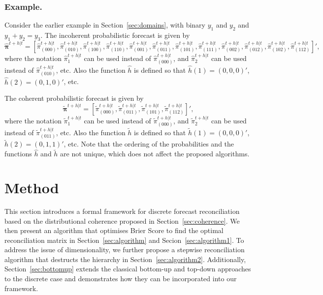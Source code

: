 \documentclass[a4paper,review,12pt,authoryear]{elsarticle}
\newcommand{\bpi}{\bm{\pi}}
\begin{document}
  \subsubsection*{\textbf{Example}.}
  
  Consider the earlier example in Section~\ref{sec:domains}, with binary $y_1$ and $y_2$ and $y_1+y_2=y_3$. The incoherent probabilistic forecast is given by
  \[
    \hat{\bpi}^{t+h|t}= \left[       
      \hat{\pi}^{t+h|t}_{(000)},
       \hat{\pi}^{t+h|t}_{(010)},
       \hat{\pi}^{t+h|t}_{(100)},
       \hat{\pi}^{t+h|t}_{(110)},
       \hat{\pi}^{t+h|t}_{(001)},
       \hat{\pi}^{t+h|t}_{(011)},
       \hat{\pi}^{t+h|t}_{(101)},
       \hat{\pi}^{t+h|t}_{(111)},
       \hat{\pi}^{t+h|t}_{(002)},
       \hat{\pi}^{t+h|t}_{(012)},
       \hat{\pi}^{t+h|t}_{(102)},
       \hat{\pi}^{t+h|t}_{(112)}
       \right]',
  \]
  where the notation $\hat{\pi}^{t+h|t}_{1}$ can be used instead of $\hat{\pi}^{t+h|t}_{(000)}$, and $\hat{\pi}^{t+h|t}_{2}$ can be used instead of $\hat{\pi}^{t+h|t}_{(010)}$, etc. Also the function $\hat{h}$ is defined so that $\hat{h}(1)=(0,0,0)'$, $\hat{h}(2)=(0,1,0)'$, etc.
  
  The coherent probabilistic forecast is given by
  \[
  \tilde{\bpi}^{t+h|t}=\left[
  \tilde{\pi}^{t+h|t}_{(000)},
  \tilde{\pi}^{t+h|t}_{(011)},
  \tilde{\pi}^{t+h|t}_{(101)},
  \tilde{\pi}^{t+h|t}_{(112)}
  \right]',\]
  where the notation $\tilde{\pi}^{t+h|t}_{1}$ can be used instead of $\tilde{\pi}^{t+h|t}_{(000)}$, and $\tilde{\pi}^{t+h|t}_{2}$ can be used instead of $\tilde{\pi}^{t+h|t}_{(011)}$, etc. Also the function $\tilde{h}$ is defined so that $\tilde{h}(1)=(0,0,0)'$, $\tilde{h}(2)=(0,1,1)'$, etc. Note that the ordering of the probabilities and the functions $\hat{h}$ and $\tilde{h}$ are not unique, which does not affect the proposed algorithms.

\section{Method}
\label{sec:method}

This section introduces a formal framework for discrete forecast reconciliation based on the distributional coherence proposed in Section~\ref{sec:coherence}.
We then present an algorithm that optimises Brier Score to find the optimal reconciliation matrix in Section~\ref{sec:algorithm} and Secion~\ref{sec:algorithm1}.
To address the issue of dimensionality, we further propose a stepwise reconciliation algorithm that destructs the hierarchy in Section~\ref{sec:algorithm2}.
Additionally, Section~\ref{sec:bottomup} extends the classical bottom-up and top-down approaches to the discrete case and demonstrates how they can be incorporated into our framework.
\end{document}
